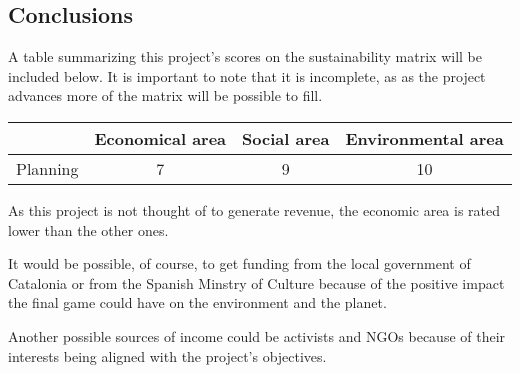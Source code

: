 \subsection{Conclusions}

A table summarizing this project's scores on the sustainability matrix will be included below. It is important to note that it is incomplete, as as the project advances more of the matrix will be possible to fill.

\begin{center}
  \begin{tabular}{ | c | c | c | c | }
    \hline
         &
        \textbf{Economical area} &
        \textbf{Social area} &
         \textbf{Environmental area} \\ 
        \hline
        Planning & 7 & 9 & 10 \\  
        \hline
  \end{tabular}
\end{center}

As this project is not thought of to generate revenue, the economic area is rated lower than the other ones.

It would be possible, of course, to get funding from the local government of Catalonia or from the Spanish Minstry of Culture
because of the positive impact the final game could have on the environment and the planet.

Another possible sources of income could be activists and \glspl{NGO} because of their interests
being aligned with the project's objectives.

